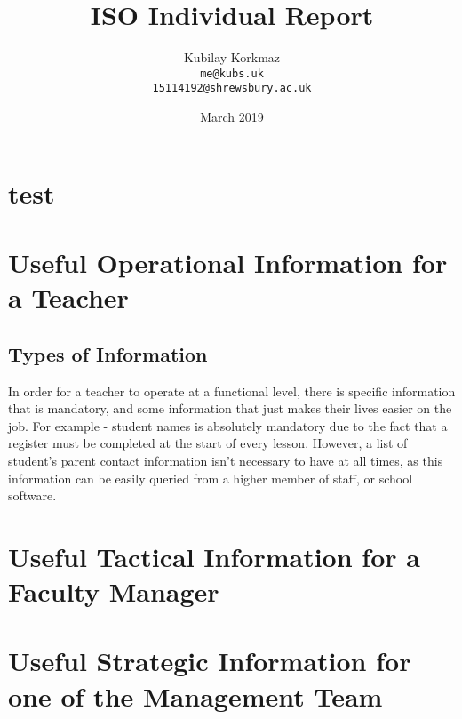 \documentclass{article}
\title{ISO Individual Report}
\author{
Kubilay Korkmaz\\
\texttt{me@kubs.uk}\\
\texttt{15114192@shrewsbury.ac.uk}
}
\date{March 2019}
\begin{document}
\maketitle

\clearpage

\tableofcontents

\clearpage

\section{test}

\section{Useful Operational Information for a Teacher}
\subsection{Types of Information}In order for a teacher to operate at a functional level, there is specific information that is mandatory, and some information that just makes their lives easier on the job. For example - student names is absolutely mandatory due to the fact that a register must be completed at the start of every lesson. However, a list of student's parent contact information isn't necessary to have at all times, as this information can be easily queried from a higher member of staff, or school software. 

\section{Useful Tactical Information for a Faculty Manager}

\section{Useful Strategic Information for one of the Management Team}

\newpage

\printglossary[type=\acronymtype]
 
\printglossary

\lstlistoflistings
\end{document}
